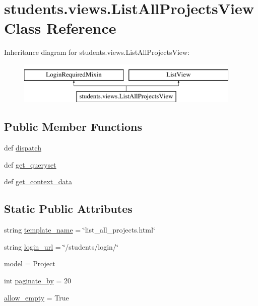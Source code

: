 \hypertarget{classstudents_1_1views_1_1_list_all_projects_view}{\section{students.\-views.\-List\-All\-Projects\-View Class Reference}
\label{classstudents_1_1views_1_1_list_all_projects_view}
}
Inheritance diagram for students.\-views.\-List\-All\-Projects\-View\-:\begin{figure}[H]
\begin{center}
\leavevmode
\includegraphics[height=2.000000cm]{classstudents_1_1views_1_1_list_all_projects_view}
\end{center}
\end{figure}
\subsection*{Public Member Functions}
\begin{DoxyCompactItemize}
\item 
def \hyperlink{classstudents_1_1views_1_1_list_all_projects_view_a0d33266bd02b1a7db4bcadb7013a02ad}{dispatch}
\item 
def \hyperlink{classstudents_1_1views_1_1_list_all_projects_view_a97ba8473b483cd8c26dfdc1a68c71488}{get\-\_\-queryset}
\item 
def \hyperlink{classstudents_1_1views_1_1_list_all_projects_view_aa3c93985310036111318a294b02c4c6e}{get\-\_\-context\-\_\-data}
\end{DoxyCompactItemize}
\subsection*{Static Public Attributes}
\begin{DoxyCompactItemize}
\item 
string \hyperlink{classstudents_1_1views_1_1_list_all_projects_view_ab06ec282a4c4a4961f2bf7dc0fd60488}{template\-\_\-name} = \char`\"{}list\-\_\-all\-\_\-projects.\-html\char`\"{}
\item 
string \hyperlink{classstudents_1_1views_1_1_list_all_projects_view_a54749455487671085d05067dd5393485}{login\-\_\-url} = \char`\"{}/students/login/\char`\"{}
\item 
\hyperlink{classstudents_1_1views_1_1_list_all_projects_view_aacf6369cc6f66b902ddc325d9f73d0ca}{model} = Project
\item 
int \hyperlink{classstudents_1_1views_1_1_list_all_projects_view_a4b0bc6c6be4be3fd1bdaf6b886dffd61}{paginate\-\_\-by} = 20
\item 
\hyperlink{classstudents_1_1views_1_1_list_all_projects_view_a9976aeeb2c980ed4ecc8715d52a1fe17}{allow\-\_\-empty} = True
\end{DoxyCompactItemize}


